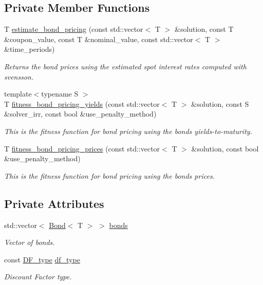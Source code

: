 \subsection*{Private Member Functions}
\begin{DoxyCompactItemize}
\item 
T \hyperlink{classbond_1_1_bond_helper_a1288528021e7c60e3a1435d39ad8611d}{estimate\+\_\+bond\+\_\+pricing} (const std\+::vector$<$ T $>$ \&solution, const T \&coupon\+\_\+value, const T \&nominal\+\_\+value, const std\+::vector$<$ T $>$ \&time\+\_\+periods)
\begin{DoxyCompactList}\small\item\em Returns the bond prices using the estimated spot interest rates computed with svensson. \end{DoxyCompactList}\item 
{\footnotesize template$<$typename S $>$ }\\T \hyperlink{classbond_1_1_bond_helper_aa1a47c41374aee7914e9c0ac374b39e4}{fitness\+\_\+bond\+\_\+pricing\+\_\+yields} (const std\+::vector$<$ T $>$ \&solution, const S \&solver\+\_\+irr, const bool \&use\+\_\+penalty\+\_\+method)
\begin{DoxyCompactList}\small\item\em This is the fitness function for bond pricing using the bonds\textquotesingle{} yields-\/to-\/maturity. \end{DoxyCompactList}\item 
T \hyperlink{classbond_1_1_bond_helper_a507eddab3d55ad3e640dfa930dcf43d0}{fitness\+\_\+bond\+\_\+pricing\+\_\+prices} (const std\+::vector$<$ T $>$ \&solution, const bool \&use\+\_\+penalty\+\_\+method)
\begin{DoxyCompactList}\small\item\em This is the fitness function for bond pricing using the bonds\textquotesingle{} prices. \end{DoxyCompactList}\end{DoxyCompactItemize}
\subsection*{Private Attributes}
\begin{DoxyCompactItemize}
\item 
std\+::vector$<$ \hyperlink{classbond_1_1_bond}{Bond}$<$ T $>$ $>$ \hyperlink{classbond_1_1_bond_helper_a61db751f82d46ce2f7f5032ff2a3b03e}{bonds}
\begin{DoxyCompactList}\small\item\em Vector of bonds. \end{DoxyCompactList}\item 
const \hyperlink{namespaceutilities_ad4290e607d0651ce53db6e5c776aca7c}{D\+F\+\_\+type} \hyperlink{classbond_1_1_bond_helper_a843e3c12a561aaac047ba70310375a2f}{df\+\_\+type}
\begin{DoxyCompactList}\small\item\em Discount Factor type. \end{DoxyCompactList}\end{DoxyCompactItemize}


